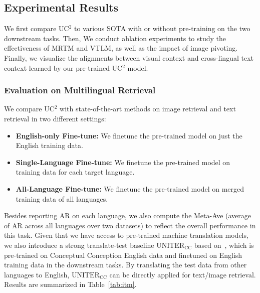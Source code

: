 \documentclass[final]{cvpr}
\newcommand{\linjie}[1]{\textcolor{asparagus}{\small{\bf [Linjie: #1 ]}}}
\newcommand{\yu}[1]{\textcolor{green}{\small{\bf [Yu: #1 ]}}}
\begin{document}
 
\subsection{Experimental Results}
We first compare UC$^2$ to various SOTA with or without pre-training on the two downstream tasks. Then, We conduct ablation experiments to study the effectiveness of MRTM and VTLM, as well as the impact of image pivoting. Finally, we visualize the alignments between visual context and cross-lingual text context learned by our pre-trained UC$^2$ model. 

\subsubsection{Evaluation on Multilingual Retrieval}
We compare UC$^2$ with state-of-the-art methods on image retrieval and text retrieval in two different settings: 
\begin{itemize}[noitemsep]
    \item \textbf{English-only Fine-tune:} We finetune the pre-trained model on just the English training data. 
    \item \textbf{Single-Language Fine-tune:} We finetune the pre-trained model on training data for each target language. 
    \item \textbf{All-Language Fine-tune:} We finetune the pre-trained model on merged training data of all languages. 
\end{itemize}
Besides reporting AR on each language, we also compute the Meta-Ave (average of AR across all languages over two datasets) to reflect the overall performance in this task. Given that we have access to pre-trained machine translation models, we also introduce a strong translate-test baseline $\text{UNITER}_{\text{CC}}$ based on~\cite{UNITER}, which is pre-trained on Conceptual Conception English data and finetuned on English training data in the downstream tasks. By translating the test data from other languages to English, $\text{UNITER}_{\text{CC}}$ can be directly applied for text/image retrieval. Results are summarized in Table~\ref{tab:itm}. 
\end{document}
